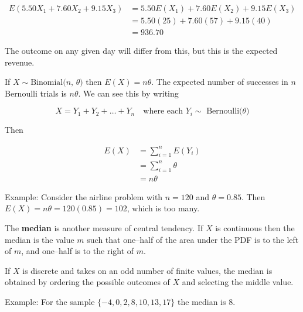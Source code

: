 \documentclass[11pt]{article}
\begin{document}
\begin{align*}
E(5.50X_{1} + 7.60X_{2} + 9.15X_{3}) &= 5.50E(X_{1}) + 7.60E(X_{2}) + 9.15E(X_{3}) \\
                                     &= 5.50(25) + 7.60(57) + 9.15(40) \\
                                     &= 936.70 
\end{align*} 

The outcome on any given day will differ from this, but this is the expected revenue.

\vspace{2mm}

If $X \sim \mbox{Binomial($n$, $\theta$)}$ then $E(X) = n\theta$. The expected number of successes in $n$ 
Bernoulli trials is $n\theta$. We can see this by writing

\begin{equation*}
X = Y_{1} + Y_{2} + \ldots + Y_{n} \quad \mbox{where each $Y_{i} \sim$ Bernoulli($\theta$)}
\end{equation*}

Then

\begin{align*}
E(X) &= \sum\limits_{i=1}^{n} E(Y_{i}) \\
     &= \sum\limits_{i=1}^{n} \theta   \\
     &= n\theta
\end{align*}

\vspace{2mm}

Example: Consider the airline problem with $n=120$ and $\theta = 0.85$. Then 
$E(X) = n\theta = 120(0.85) = 102$, which is too many.

\vspace{2mm}

The \textbf{median} is another measure of central tendency. If $X$ is continuous then the median is
the value $m$ such that one--half of the area under the PDF is to the left of $m$, and one--half is to 
the right of $m$.

\vspace{2mm}

If $X$ is discrete and takes on an odd number of finite values, the median is obtained by ordering the
possible outcomes of $X$ and selecting the middle value.

\vspace{2mm}

Example: For the sample $\{-4, 0, 2, 8, 10, 13, 17\}$ the median is $8$.
\end{document}
